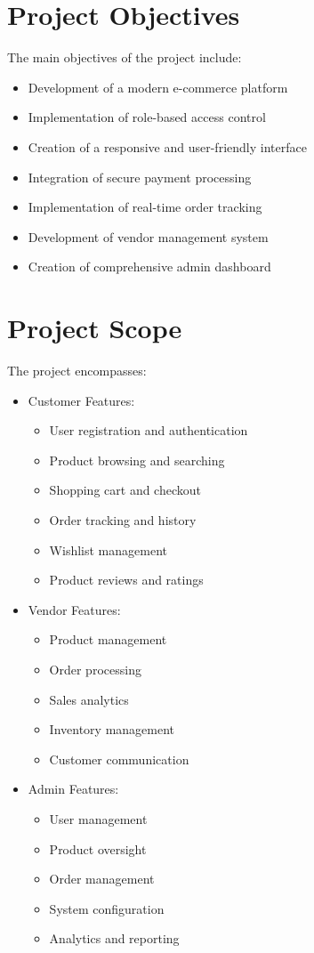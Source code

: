 \section{Project Objectives}
The main objectives of the project include:
\begin{itemize}
    \item Development of a modern e-commerce platform
    \item Implementation of role-based access control
    \item Creation of a responsive and user-friendly interface
    \item Integration of secure payment processing
    \item Implementation of real-time order tracking
    \item Development of vendor management system
    \item Creation of comprehensive admin dashboard
\end{itemize}

\section{Project Scope}
The project encompasses:
\begin{itemize}
    \item Customer Features:
    \begin{itemize}
        \item User registration and authentication
        \item Product browsing and searching
        \item Shopping cart and checkout
        \item Order tracking and history
        \item Wishlist management
        \item Product reviews and ratings
    \end{itemize}
    \item Vendor Features:
    \begin{itemize}
        \item Product management
        \item Order processing
        \item Sales analytics
        \item Inventory management
        \item Customer communication
    \end{itemize}
    \item Admin Features:
    \begin{itemize}
        \item User management
        \item Product oversight
        \item Order management
        \item System configuration
        \item Analytics and reporting
    \end{itemize}
\end{itemize}

